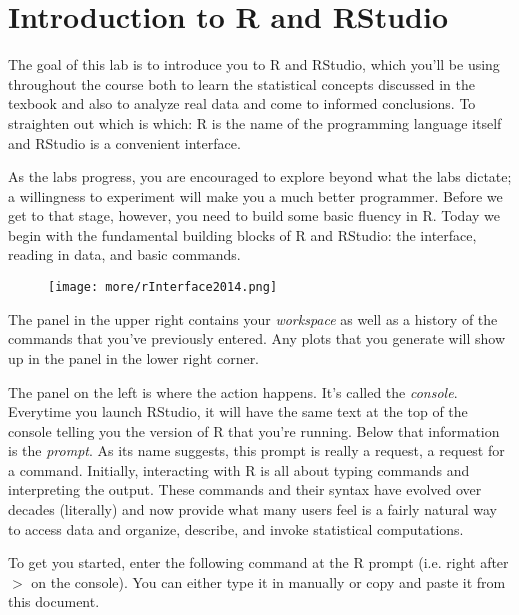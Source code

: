 \documentclass{article}\usepackage[]{graphicx}\usepackage[]{color}
\begin{document}

\section*{Introduction to R and RStudio}

The goal of this lab is to introduce you to R and RStudio, which you'll be using throughout the course both to learn the statistical concepts discussed in the texbook and also to analyze real data and come to informed conclusions.  To straighten out which is which: R is the name of the programming language itself and RStudio is a convenient interface.

As the labs progress, you are encouraged to explore beyond what the labs dictate; a willingness to experiment will make you a much better programmer.  Before we get to that stage, however, you need to build some basic fluency in R.  Today we begin with the fundamental building blocks of R and RStudio: the interface, reading in data, and basic commands.

\begin{figure}[h]
\centering
\texttt{[image: more/rInterface2014.png]}
\end{figure}

The panel in the upper right contains your \emph{workspace} as well as a history of the commands that you've previously entered.  Any plots that you generate will show up in the panel in the lower right corner.

The panel on the left is where the action happens.  It's called the \emph{console}.  Everytime you launch RStudio, it will have the same text at the top of the console telling you the version of R that you're running.  Below that information is the \emph{prompt}.  As its name suggests, this prompt is really a request, a request for a command.  Initially, interacting with R is all about typing commands and interpreting the output. These commands and their syntax have evolved over decades (literally) and now provide what many users feel is a fairly natural way to access data and organize, describe, and invoke statistical computations.

To get you started, enter the following command at the R prompt (i.e. right after $>$ on the console).  You can either type it in manually or copy and paste it from this document.
\end{document}

